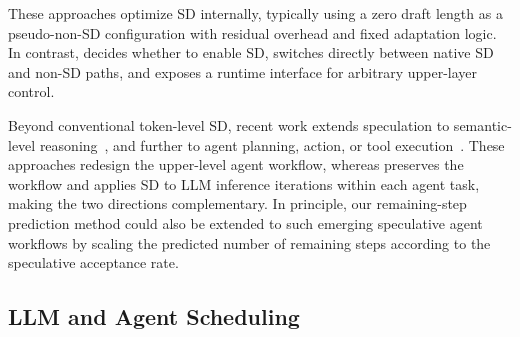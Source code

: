 These approaches optimize SD internally, typically using a zero draft length as a pseudo-non-SD configuration with residual overhead and fixed adaptation logic. 
In contrast, \sysname decides whether to enable SD, switches directly between native SD and non-SD paths, and exposes a runtime interface for arbitrary upper-layer control.


Beyond conventional token-level SD, recent work extends speculation to semantic-level reasoning~\citep{SpecReason,DREAM-R}, and further to agent planning, action, or tool execution~\citep{Interactive_Speculative_Planning,Dynamic_Speculative_Agent_Planning,Speculative_Actions}.
These approaches redesign the upper-level agent workflow, whereas \sysname preserves the workflow and applies SD to LLM inference iterations within each agent task, making the two directions complementary. 
In principle, our remaining-step prediction method could also be extended to such emerging speculative agent workflows by scaling the predicted number of remaining steps according to the speculative acceptance rate.


\subsection{LLM and Agent Scheduling}



